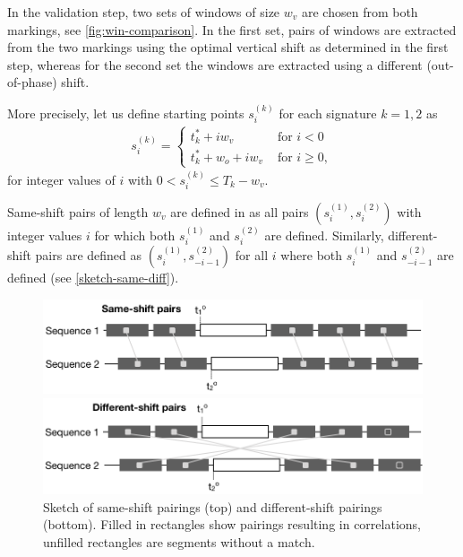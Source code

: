 \documentclass[12pt]{article}
\begin{document}
In the validation step, two sets of windows of size \(w_v\) are chosen
from both markings, see \autoref{fig:win-comparison}. In the first set,
pairs of windows are extracted from the two markings using the optimal
vertical shift as determined in the first step, whereas for the second
set the windows are extracted using a different (out-of-phase) shift.

More precisely, let us define starting points \(s_i^{(k)}\) for each
signature \(k = 1, 2\) as \begin{eqnarray}\label{eq.start}
s^{(k)}_i = 
\begin{cases}
t_k^* + i w_v & \text{ for } i < 0 \\
t_k^* + w_ o + i w_v & \text{ for } i \ge 0,
\end{cases}
\end{eqnarray} for integer values of \(i\) with
\(0 < s^{(k)}_i \le T_k - w_v\).

Same-shift pairs of length \(w_v\) are defined in \citet{hadler} as all
pairs \((s_i^{(1)}, s_i^{(2)})\) with integer values \(i\) for which
both \(s_i^{(1)}\) and \(s_i^{(2)}\) are defined. Similarly,
different-shift pairs are defined as \((s_i^{(1)}, s_{-i-1}^{(2)})\) for
all \(i\) where both \(s_i^{(1)}\) and \(s_{-i-1}^{(2)}\) are defined
(see \autoref{sketch-same-diff}).

\begin{figure}[hbtp]
\centering
\includegraphics[width=.7\textwidth]{images/sketch-same.png}

\includegraphics[width=.7\textwidth]{images/sketch-diff.png}
\caption{\label{sketch-same-diff}Sketch of same-shift pairings  (top) and different-shift pairings (bottom). Filled in rectangles show pairings resulting in correlations, unfilled rectangles are segments without a match.}
\end{figure}
\end{document}

